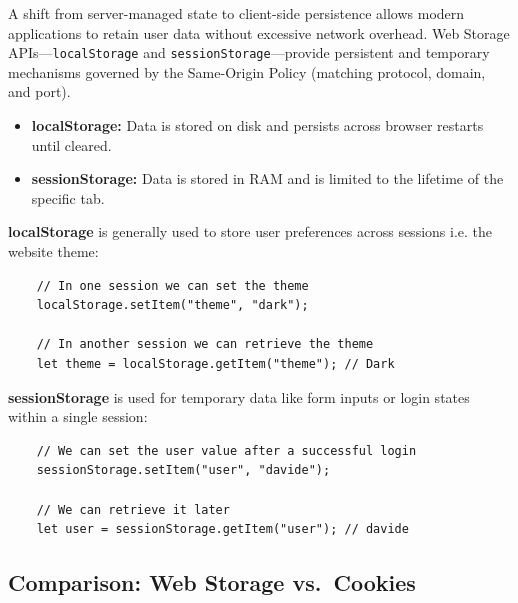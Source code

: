 \documentclass{scrbook}
\begin{document}
	A shift from server-managed state to client-side persistence allows modern applications to retain user data without excessive network overhead. Web Storage APIs---\texttt{localStorage} and \texttt{sessionStorage}---provide persistent and temporary mechanisms governed by the Same-Origin Policy (matching protocol, domain, and port).
	
	\begin{itemize}
	    \item \textbf{localStorage:} Data is stored on disk and persists across browser restarts until cleared.
	    \item \textbf{sessionStorage:} Data is stored in RAM and is limited to the lifetime of the specific tab.
	\end{itemize}
	
	\textbf{localStorage} is generally used to store user preferences across sessions i.e. the website theme:
	
	\begin{lstlisting}
	// In one session we can set the theme
	localStorage.setItem("theme", "dark");
		
	// In another session we can retrieve the theme
	let theme = localStorage.getItem("theme"); // Dark
	\end{lstlisting}
	
	\textbf{sessionStorage} is used for temporary data like form inputs or login states within a single session:
	
	\begin{lstlisting}
	// We can set the user value after a successful login
	sessionStorage.setItem("user", "davide");
		
	// We can retrieve it later
	let user = sessionStorage.getItem("user"); // davide
	\end{lstlisting}
	
	\subsection{Comparison: Web Storage vs.\ Cookies}
	
\end{document}
